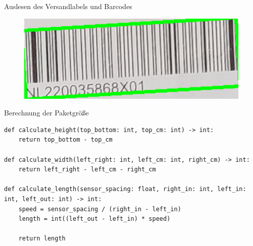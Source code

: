 \documentclass[10pt,ngerman]{beamer}
\begin{document}
\begin{frame}[fragile]{Auslesen des Versandlabels und Barcodes}
  \begin{figure}[htpb]
    \centering
    \includegraphics[width=1\textwidth]{pics/barcode.png}
  \end{figure}
\end{frame}



\begin{frame}[fragile]{Berechnung der Paketgröße}
  \begin{lstlisting}[style=MyPythonStyle,
    breaklines=true, firstnumber=8]
def calculate_height(top_bottom: int, top_cm: int) -> int:
    return top_bottom - top_cm

def calculate_width(left_right: int, left_cm: int, right_cm) -> int:
    return left_right - left_cm - right_cm

def calculate_length(sensor_spacing: float, right_in: int, left_in: int, left_out: int) -> int:
    speed = sensor_spacing / (right_in - left_in)
    length = int((left_out - left_in) * speed)

    return length
  \end{lstlisting}
\end{frame}

\end{document}
